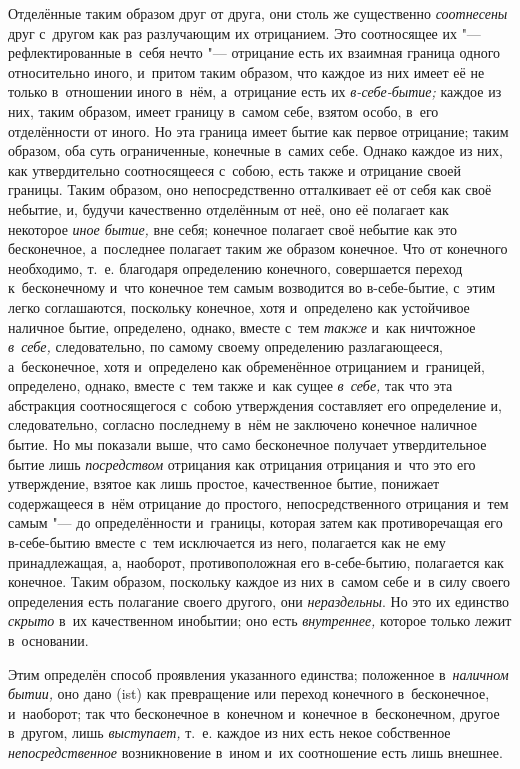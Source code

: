 Отделённые таким образом друг от друга, они столь же существенно
{\em соотнесены} друг с~другом как раз разлучающим их отрицанием. Это
соотносящее их "--- рефлектированные в~себя нечто "--- отрицание есть их
взаимная граница одного относительно иного, и~притом таким образом, что каждое
из них имеет её не только в~отношении иного в~нём, а~отрицание есть их
{\em в-себе-бытие;} каждое из них, таким образом, имеет границу в~самом себе,
взятом особо, в~его отделённости от иного. Но эта граница имеет бытие как
первое отрицание; таким образом, оба суть ограниченные, конечные в~самих себе.
Однако каждое из них, как утвердительно соотносящееся с~собою, есть также и
отрицание своей границы. Таким образом, оно непосредственно отталкивает её от
себя как своё небытие, и, будучи качественно отделённым от неё, оно её полагает
как некоторое {\em иное бытие,} вне себя; конечное полагает своё небытие как
это бесконечное, а~последнее полагает таким же образом конечное. Что от
конечного необходимо, т.~е. благодаря определению конечного, совершается
переход к~бесконечному и~что конечное тем самым возводится во в-себе-бытие,
с~этим легко соглашаются, поскольку конечное, хотя и~определено как устойчивое
наличное бытие, определено, однако, вместе с~тем {\em также} и~как ничтожное
{\em в~себе,} следовательно, по самому своему определению разлагающееся,
а~бесконечное, хотя и~определено как обременённое отрицанием и~границей,
определено, однако, вместе с~тем также и~как сущее {\em в~себе,} так что эта
абстракция соотносящегося с~собою утверждения составляет его определение и,
следовательно, согласно последнему в~нём не заключено конечное наличное бытие.
Но мы показали выше, что само бесконечное получает утвердительное бытие лишь
{\em посредством} отрицания как отрицания отрицания и~что это его утверждение,
взятое как лишь простое, качественное бытие, понижает содержащееся в~нём
отрицание до простого, непосредственного отрицания и~тем самым "--- до
определённости и~границы, которая затем как противоречащая его в-себе-бытию
вместе с~тем исключается из него, полагается как не ему принадлежащая, а,
наоборот, противоположная его в-себе-бытию, полагается как конечное. Таким
образом, поскольку каждое из них в~самом себе и~в силу своего определения есть
полагание своего другого, они {\em нераздельны}. Но это их единство
{\em скрыто} в~их качественном инобытии; оно есть {\em внутреннее,} которое
только лежит в~основании.

Этим определён способ проявления указанного единства; положенное
в~{\em наличном бытии,} оно дано (ist) как превращение или переход конечного
в~бесконечное, и~наоборот; так что бесконечное в~конечном и~конечное
в~бесконечном, другое в~другом, лишь {\em выступает,} т.~е. каждое из них есть
некое собственное {\em непосредственное} возникновение в~ином и~их соотношение
есть лишь внешнее.


